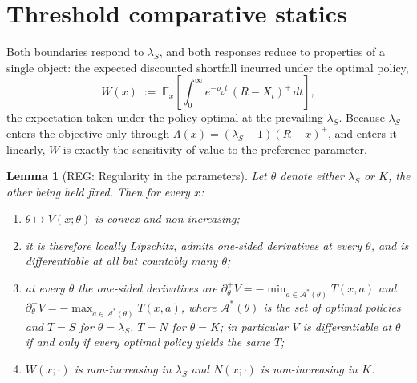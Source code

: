 \documentclass[11pt]{article}
\newtheorem{lemma}{Lemma}
\theoremstyle{remark}
\begin{document}
\section{Threshold comparative statics}
\label{sec:compstat-thm}

Both boundaries respond to $\lambda_S$, and both responses reduce to
properties of a single object: the expected discounted shortfall incurred
under the optimal policy,
\begin{equation}
W(x) \;:=\; \mathbb{E}_x\!\left[\int_0^\infty e^{-\rho_L t}\,(R-X_t)^+\,dt\right],
\label{eq:Wdef}
\end{equation}
the expectation taken under the policy optimal at the prevailing
$\lambda_S$. Because $\lambda_S$ enters the objective only through
$\Lambda(x) = (\lambda_S-1)(R-x)^+$, and enters it linearly, $W$ is
exactly the sensitivity of value to the preference parameter.

\begin{lemma}[REG: Regularity in the parameters]
\label{lem:reg}
Let $\theta$ denote either $\lambda_S$ or $K$, the other being held fixed.
Then for every $x$:
\begin{enumerate}
\item[(i)] $\theta \mapsto V(x;\theta)$ is convex and non-increasing;
\item[(ii)] it is therefore locally Lipschitz, admits one-sided
  derivatives at every $\theta$, and is differentiable at all but
  countably many $\theta$;
\item[(iii)] at every $\theta$ the one-sided derivatives are
  $\partial^{+}_\theta V = -\min_{a \in \mathcal{A}^*(\theta)} T(x,a)$ and
  $\partial^{-}_\theta V = -\max_{a \in \mathcal{A}^*(\theta)} T(x,a)$,
  where $\mathcal{A}^*(\theta)$ is the set of optimal policies and
  $T = S$ for $\theta=\lambda_S$, $T = N$ for $\theta = K$; in particular
  $V$ is differentiable at $\theta$ if and only if every optimal policy
  yields the same $T$;
\item[(iv)] $W(x;\cdot)$ is non-increasing in $\lambda_S$ and
  $N(x;\cdot)$ is non-increasing in $K$.
\end{enumerate}
\end{lemma}
\end{document}
